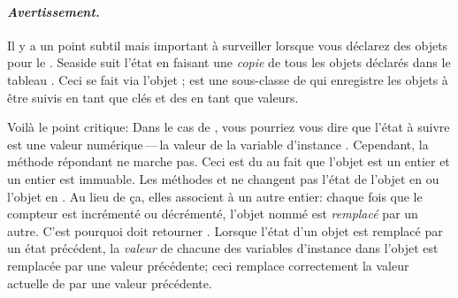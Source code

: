 \documentclass[a4paper,10pt,twoside]{book}
\begin{document}
\paragraph{\emph{Avertissement.}}
Il y a un point subtil mais important à surveiller lorsque vous
déclarez des objets pour le \backtracking.
Seaside suit l'état en faisant une \emph{copie}
de tous les objets déclarés dans le tableau .
Ceci se fait via l'objet
 ;  est une sous-classe
de  qui enregistre les objets à être suivis
en tant que clés et des  en tant que valeurs.


Voilà le point critique:
Dans le cas de , vous pourriez vous dire que l'état à
suivre est une valeur numérique\,---\,la valeur de la variable
d'instance .
Cependant, la méthode  répondant  ne
marche pas.
Ceci est du au fait que l'objet  est un entier et un entier
est immuable.
Les méthodes  et  ne changent pas l'état de
l'objet  en  ou l'objet  en .
Au lieu de ça, elles associent  à un autre entier:
chaque fois que le compteur est incrémenté ou décrémenté, l'objet
nommé  est \emph{remplacé} par un autre.
C'est pourquoi  doit retourner .
Lorsque l'état d'un objet \mbox{} est remplacé par un
état précédent, la \emph{valeur} de chacune des variables d'instance
dans l'objet est remplacée par une valeur précédente; ceci remplace
correctement la valeur actuelle de  par une valeur
précédente.
\end{document}
